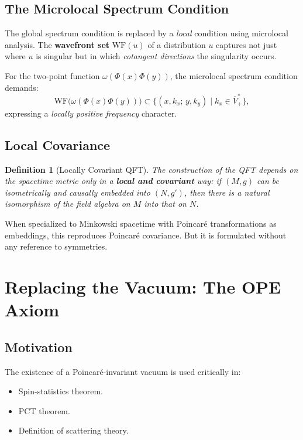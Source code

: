 \documentclass[11pt,a4paper]{article}
\newtheorem{definition}{Definition}[section]
\begin{document}
\subsection{The Microlocal Spectrum Condition}

The global spectrum condition is replaced by a \emph{local} condition
using microlocal analysis. The \textbf{wavefront set} $\mathrm{WF}(u)$
of a distribution $u$ captures not just where $u$ is singular but in
which \emph{cotangent directions} the singularity occurs.

For the two-point function $\omega(\Phi(x)\Phi(y))$, the microlocal
spectrum condition demands:
\[
  \mathrm{WF}\bigl(\omega(\Phi(x)\Phi(y))\bigr) \subset
  \bigl\{(x,k_x;\, y,k_y) \;\big|\; k_x \in \overline{V}_+^*\bigr\},
\]
expressing a \emph{locally positive frequency} character.

\subsection{Local Covariance}

\begin{definition}[Locally Covariant QFT]
The construction of the QFT depends on the spacetime metric only in a
\textbf{local and covariant} way: if $(M,g)$ can be isometrically and
causally embedded into $(N,g')$, then there is a natural isomorphism
of the field algebra on $M$ into that on $N$.
\end{definition}

When specialized to Minkowski spacetime with Poincar\'e transformations
as embeddings, this reproduces Poincar\'e covariance. But it is formulated
without any reference to symmetries.

\section{Replacing the Vacuum: The OPE Axiom}

\subsection{Motivation}

The existence of a Poincar\'e-invariant vacuum is used critically in:
\begin{itemize}[nosep]
  \item Spin-statistics theorem.
  \item PCT theorem.
  \item Definition of scattering theory.
\end{itemize}
\end{document}
